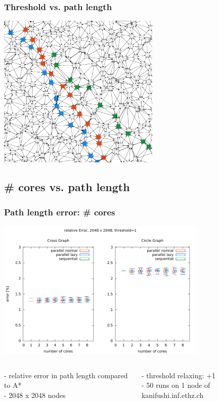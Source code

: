 \documentclass{beamer}
\begin{document}
\begin{frame}
\frametitle{Threshold vs. path length}
\begin{center}
	\includegraphics[height=210pt]{path_close.png}
\end{center}
\end{frame}

\subsection{\# cores vs. path length}

\begin{frame}
\frametitle{Path length error: \# cores}
\begin{center}
	\includegraphics[trim=0pt 0pt 0pt 30pt, clip, height=190pt]{error_cores.pdf}
\end{center}

\tiny
\begin{columns}[t] %
- relative error in path length compared to A* \\
- 2048 x 2048 nodes

- threshold relaxing: +1 \\
- 50 runs on 1 node of kanifushi.inf.ethz.ch
\end{columns}
\normalsize
\end{frame}
\end{document}
